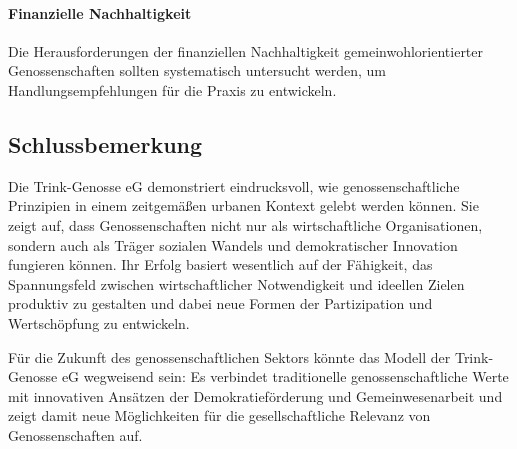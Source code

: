 \paragraph{Finanzielle Nachhaltigkeit}
Die Herausforderungen der finanziellen Nachhaltigkeit gemeinwohlorientierter Genossenschaften sollten systematisch untersucht werden, um Handlungsempfehlungen für die Praxis zu entwickeln.

\subsection{Schlussbemerkung}

Die Trink-Genosse eG demonstriert eindrucksvoll, wie genossenschaftliche Prinzipien in einem zeitgemäßen urbanen Kontext gelebt werden können. Sie zeigt auf, dass Genossenschaften nicht nur als wirtschaftliche Organisationen, sondern auch als Träger sozialen Wandels und demokratischer Innovation fungieren können. Ihr Erfolg basiert wesentlich auf der Fähigkeit, das Spannungsfeld zwischen wirtschaftlicher Notwendigkeit und ideellen Zielen produktiv zu gestalten und dabei neue Formen der Partizipation und Wertschöpfung zu entwickeln.

Für die Zukunft des genossenschaftlichen Sektors könnte das Modell der Trink-Genosse eG wegweisend sein: Es verbindet traditionelle genossenschaftliche Werte mit innovativen Ansätzen der Demokratieförderung und Gemeinwesenarbeit und zeigt damit neue Möglichkeiten für die gesellschaftliche Relevanz von Genossenschaften auf.
